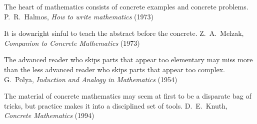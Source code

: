 \vfill
\begin{quotes}
The heart of mathematics consists of 
concrete examples and concrete problems.
\Author P.\ R.\ Halmos, {\sl How to write mathematics} (1973)

\bigskip
It is downright sinful to teach 
the abstract before the concrete.
\Author Z.\ A.\ Melzak, {\sl Companion to Concrete Mathematics} (1973)

\bigskip
The advanced reader who skips parts that appear 
too elementary may miss more than the less advanced reader 
who skips parts that appear too complex.
\Author G.\ Polya, {\sl Induction and Analogy in Mathematics} (1954)

\bigskip
The material of concrete mathematics may seem at first to be a disparate
bag of tricks, but practice makes it into a disciplined set of tools.
\Author D.\ E.\ Knuth, {\sl Concrete Mathematics} (1994)
\end{quotes}

